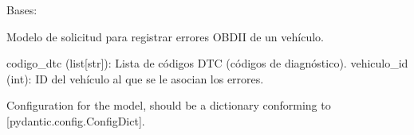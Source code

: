 \documentclass[letterpaper,10pt,spanish]{sphinxmanual}
\begin{document}
\begin{fulllineitems}
\label{\detokenize{modelos:main.ErrorVehiculoRegistro}}
\pysigstartsignatures
\pysiglinewithargsret
{}
{\sphinxparamcomma {}\sphinxparamcomma {}}
{}
\pysigstopsignatures
\sphinxAtStartPar
Bases: 

\sphinxAtStartPar
Modelo de solicitud para registrar errores OBD\sphinxhyphen{}II de un vehículo.
\begin{description}
\sphinxAtStartPar
codigo\_dtc (list{[}str{]}): Lista de códigos DTC (códigos de diagnóstico).
vehiculo\_id (int): ID del vehículo al que se le asocian los errores.

\end{description}

\begin{fulllineitems}
\label{\detokenize{modelos:main.ErrorVehiculoRegistro.model_config}}
\pysigstartsignatures
\pysigline
{}
\pysigstopsignatures
\sphinxAtStartPar
Configuration for the model, should be a dictionary conforming to {[}\sphinxtitleref{ConfigDict}{]}{[}pydantic.config.ConfigDict{]}.

\end{fulllineitems}


\end{fulllineitems}

\end{document}
